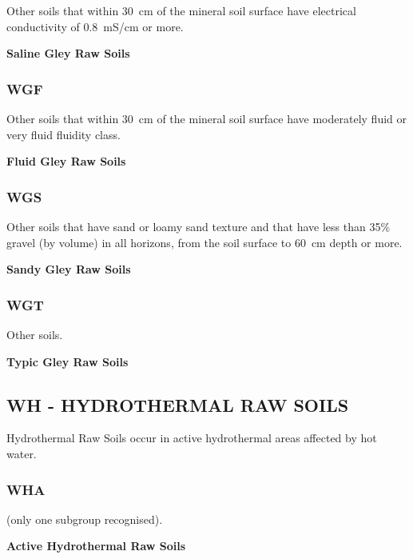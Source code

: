 \documentclass[
  letterpaper,
  DIV=11,
  numbers=noendperiod]{scrreprt}
\begin{document}
Other soils that within 30~cm of the mineral soil surface have
electrical conductivity of 0.8~mS/cm or more.

\textbf{Saline Gley Raw Soils}

\hypertarget{sec-key-WGF}{%
\subsubsection{\texorpdfstring{\textbf{WGF}}{WGF}}\label{sec-key-WGF}}

Other soils that within 30~cm of the mineral soil surface have
moderately fluid or very fluid fluidity class.

\textbf{Fluid Gley Raw Soils}

\hypertarget{sec-key-WGS}{%
\subsubsection{\texorpdfstring{\textbf{WGS}}{WGS}}\label{sec-key-WGS}}

Other soils that have sand or loamy sand texture and that have less than
35\% gravel (by volume) in all horizons, from the soil surface to 60~cm
depth or more.

\textbf{Sandy Gley Raw Soils}

\hypertarget{sec-key-WGT}{%
\subsubsection{\texorpdfstring{\textbf{WGT}}{WGT}}\label{sec-key-WGT}}

Other soils.

\textbf{Typic Gley Raw Soils}

\hypertarget{sec-WH}{%
\subsection{\texorpdfstring{\textbf{WH} - HYDROTHERMAL RAW
SOILS}{WH - HYDROTHERMAL RAW SOILS}}\label{sec-WH}}

Hydrothermal Raw Soils occur in active hydrothermal areas affected by
hot water.

\hypertarget{sec-key-WHA}{%
\subsubsection{\texorpdfstring{\textbf{WHA}}{WHA}}\label{sec-key-WHA}}

(only one subgroup recognised).

\textbf{Active Hydrothermal Raw Soils}
\end{document}

